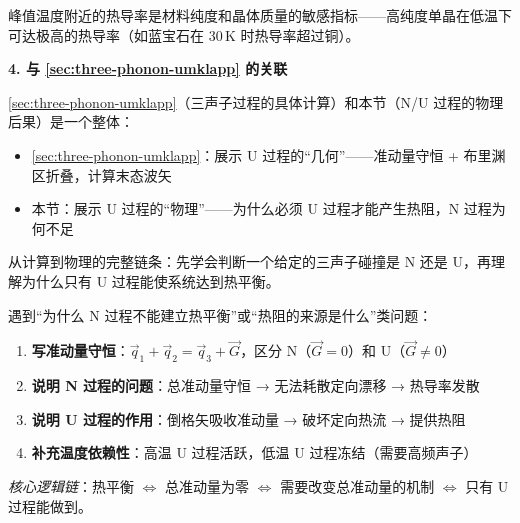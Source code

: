 \begin{insightbox}[物理图像与概念深化]
峰值温度附近的热导率是材料纯度和晶体质量的敏感指标——高纯度单晶在低温下可达极高的热导率（如蓝宝石在 $30\,\mathrm{K}$ 时热导率超过铜）。

\textbf{4. 与 \ref{sec:three-phonon-umklapp} 的关联}

\ref{sec:three-phonon-umklapp}（三声子过程的具体计算）和本节（N/U 过程的物理后果）是一个整体：
\begin{itemize}
    \item \ref{sec:three-phonon-umklapp}：展示 U 过程的``几何''——准动量守恒 + 布里渊区折叠，计算末态波矢
    \item 本节：展示 U 过程的``物理''——为什么必须 U 过程才能产生热阻，N 过程为何不足
\end{itemize}

从计算到物理的完整链条：先学会判断一个给定的三声子碰撞是 N 还是 U，再理解为什么只有 U 过程能使系统达到热平衡。
\end{insightbox}

\begin{thinkbox}
遇到``为什么 N 过程不能建立热平衡''或``热阻的来源是什么''类问题：
\begin{enumerate}
    \item \textbf{写准动量守恒}：$\vec q_1+\vec q_2=\vec q_3+\vec G$，区分 N（$\vec G=0$）和 U（$\vec G\neq0$）
    \item \textbf{说明 N 过程的问题}：总准动量守恒 → 无法耗散定向漂移 → 热导率发散
    \item \textbf{说明 U 过程的作用}：倒格矢吸收准动量 → 破坏定向热流 → 提供热阻
    \item \textbf{补充温度依赖性}：高温 U 过程活跃，低温 U 过程冻结（需要高频声子）
\end{enumerate}
\textit{核心逻辑链}：热平衡 $\Leftrightarrow$ 总准动量为零 $\Leftrightarrow$ 需要改变总准动量的机制 $\Leftrightarrow$ 只有 U 过程能做到。
\end{thinkbox}
